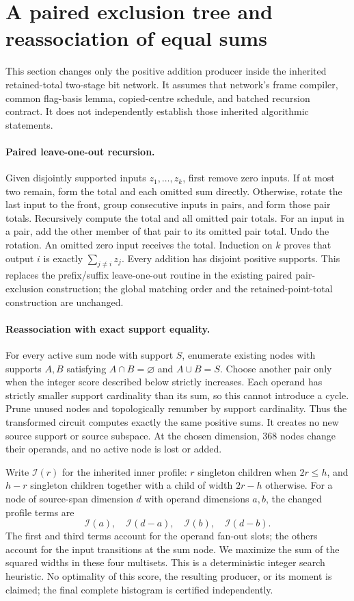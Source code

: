 \section{A paired exclusion tree and reassociation of equal sums}

This section changes only the positive addition producer inside the inherited
retained-total two-stage bit network. It assumes that network's frame compiler,
common flag-basis lemma, copied-centre schedule, and batched recursion contract.
It does not independently establish those inherited algorithmic statements.

\paragraph{Paired leave-one-out recursion.}
Given disjointly supported inputs $z_1,\ldots,z_k$, first remove zero inputs.
If at most two remain, form the total and each omitted sum directly. Otherwise,
rotate the last input to the front, group consecutive inputs in pairs, and form
those pair totals. Recursively compute the total and all omitted pair totals.
For an input in a pair, add the other member of that pair to its omitted pair
total. Undo the rotation. An omitted zero input receives the total.
Induction on $k$ proves that output $i$ is exactly $\sum_{j\ne i}z_j$.
Every addition has disjoint positive supports. This replaces the prefix/suffix
leave-one-out routine in the existing paired pair-exclusion construction;
the global matching order and the retained-point-total construction are unchanged.

\paragraph{Reassociation with exact support equality.}
For every active sum node with support $S$, enumerate existing nodes with
supports $A,B$ satisfying $A\cap B=\varnothing$ and $A\cup B=S$.
Choose another pair only when the integer score described below strictly
increases. Each operand has strictly smaller support cardinality than its sum,
so this cannot introduce a cycle. Prune unused nodes and topologically renumber
by support cardinality. Thus the transformed circuit computes exactly the same
positive sums. It creates no new source support or source subspace.
At the chosen dimension, 368 nodes change their operands, and no active node
is lost or added.

Write $\mathcal I(r)$ for the inherited inner profile: $r$ singleton children
when $2r\le h$, and $h-r$ singleton children together with a child of width
$2r-h$ otherwise. For a node of source-span dimension $d$ with operand dimensions
$a,b$, the changed profile terms are
\[
 \mathcal I(a),\quad\mathcal I(d-a),\quad
 \mathcal I(b),\quad\mathcal I(d-b).
\]
The first and third terms account for the operand fan-out slots; the others
account for the input transitions at the sum node. We maximize the sum of the
squared widths in these four multisets. This is a deterministic integer search
heuristic. No optimality of this score, the resulting producer, or its moment
is claimed; the final complete histogram is certified independently.


